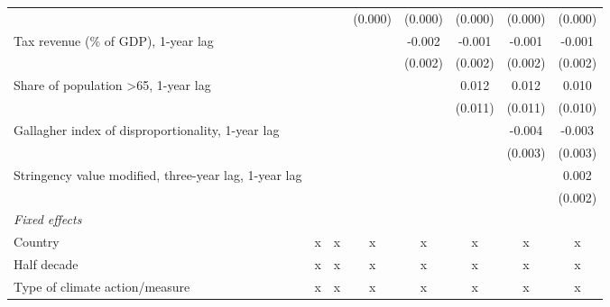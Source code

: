 \begin{tabular}{lccccccc}
                                                                     &               &               & (0.000)       & (0.000)       & (0.000)       & (0.000)       & (0.000)\\   
   Tax revenue (\% of GDP), 1-year lag                               &               &               &               & -0.002        & -0.001        & -0.001        & -0.001\\   
                                                                     &               &               &               & (0.002)       & (0.002)       & (0.002)       & (0.002)\\   
   Share of population >65, 1-year lag                               &               &               &               &               & 0.012         & 0.012         & 0.010\\   
                                                                     &               &               &               &               & (0.011)       & (0.011)       & (0.010)\\   
   Gallagher index of disproportionality, 1-year lag                 &               &               &               &               &               & -0.004        & -0.003\\   
                                                                     &               &               &               &               &               & (0.003)       & (0.003)\\   
   Stringency value modified, three-year lag, 1-year lag             &               &               &               &               &               &               & 0.002\\   
                                                                     &               &               &               &               &               &               & (0.002)\\   
   \emph{Fixed effects}\\
   Country                                                           & x             & x             & x             & x             & x             & x             & x\\  
   Half decade                                                       & x             & x             & x             & x             & x             & x             & x\\  
   Type of climate action/measure                                    & x             & x             & x             & x             & x             & x             & x\\  

\end{tabular}
